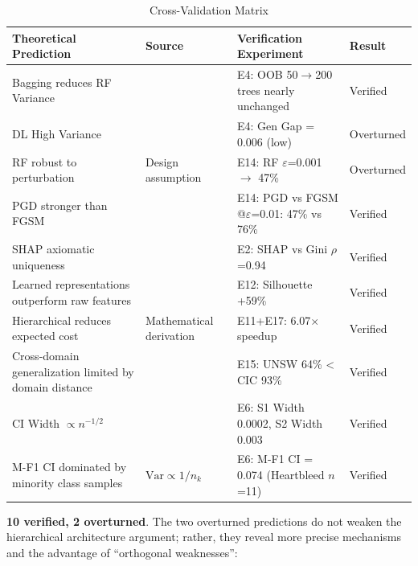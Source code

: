 \documentclass[sigconf]{acmart}
\begin{document}
\begin{table}[H]
\caption{Cross-Validation Matrix}
\label{tab:cross_validation}
\begin{tabular}{llll}
\toprule
\textbf{Theoretical Prediction} & \textbf{Source} & \textbf{Verification Experiment} & \textbf{Result} \\
\midrule
Bagging reduces RF Variance & \cite{3} & E4: OOB 50$\to$200 trees nearly unchanged & Verified \\
DL High Variance & \cite{5} & E4: Gen Gap = 0.006 (low) & Overturned \\
RF robust to perturbation & Design assumption & E14: RF $\varepsilon$=0.001 $\to$ 47\% & Overturned \\
PGD stronger than FGSM & \cite{13} & E14: PGD vs FGSM @$\varepsilon$=0.01: 47\% vs 76\% & Verified \\
SHAP axiomatic uniqueness & \cite{12} & E2: SHAP vs Gini $\rho$=0.94 & Verified \\
Learned representations outperform raw features & \cite{5} & E12: Silhouette +59\% & Verified \\
Hierarchical reduces expected cost & Mathematical derivation & E11+E17: 6.07$\times$ speedup & Verified \\
Cross-domain generalization limited by domain distance & \cite{2} & E15: UNSW 64\% < CIC 93\% & Verified \\
CI Width $\propto n^{-1/2}$ & \cite{6} & E6: S1 Width 0.0002, S2 Width 0.003 & Verified \\
M-F1 CI dominated by minority class samples & $\text{Var} \propto 1/n_k$ & E6: M-F1 CI = 0.074 (Heartbleed $n$=11) & Verified \\
\bottomrule
\end{tabular}
\end{table}

\textbf{10 verified, 2 overturned}. The two overturned predictions do not weaken the hierarchical architecture argument; rather, they reveal more precise mechanisms and the advantage of ``orthogonal weaknesses'':
\end{document}
